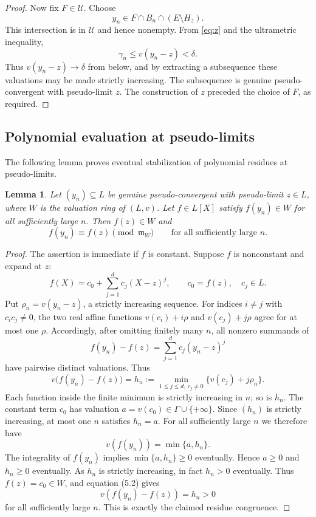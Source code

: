 \documentclass[11pt]{amsart}
\newtheorem{lemma}[theorem]{Lemma}
\theoremstyle{definition}
\theoremstyle{remark}
\newcommand{\m}{\mathfrak m}
\newcommand{\U}{\mathcal U}
\newcommand{\g}{\Gamma}
\begin{document}
\begin{proof}
Now fix $F\in\U$. Choose
\[
 y_n\in F\cap B_n\cap(E\setminus H_z).
\]
This intersection is in $\U$ and hence nonempty. From \eqref{eq:z} and the ultrametric inequality,
\[
 \gamma_n\leq v(y_n-z)<\delta.
\]
Thus $v(y_n-z)\to\delta$ from below, and by extracting a subsequence these valuations may be made strictly increasing. The subsequence is genuine pseudo-convergent with pseudo-limit $z$. The construction of $z$ preceded the choice of $F$, as required.
\end{proof}

\subsection{Polynomial evaluation at pseudo-limits}\label{sec:residue}


The following lemma proves eventual stabilization of polynomial residues at pseudo-limits.
\begin{lemma}\label{lem:residue}
Let $(y_n)\subseteq L$ be genuine pseudo-convergent with pseudo-limit $z\in L$, where $W$ is the valuation ring of $(L,v)$. Let $f\in L[X]$ satisfy $f(y_n)\in W$ for all sufficiently large $n$. Then $f(z)\in W$ and
\[
 f(y_n)\equiv f(z)\pmod{\m_W}\qquad\text{for all sufficiently large }n.
 \tag{5.1}\label{eq:residuestab}
\]
\end{lemma}
\begin{proof}
The assertion is immediate if $f$ is constant. Suppose $f$ is nonconstant and expand at $z$:
\[
 f(X)=c_0+\sum_{j=1}^d c_j(X-z)^j,
 \qquad c_0=f(z),\quad c_j\in L.
\]
Put $\rho_n=v(y_n-z)$, a strictly increasing sequence. For indices $i\ne j$ with $c_ic_j\ne0$, the two real affine functions $v(c_i)+i\rho$ and $v(c_j)+j\rho$ agree for at most one $\rho$. Accordingly, after omitting finitely many $n$, all nonzero summands of
\[
 f(y_n)-f(z)=\sum_{j=1}^d c_j(y_n-z)^j
\]
have pairwise distinct valuations. Thus
\[
 v\bigl(f(y_n)-f(z)\bigr)=h_n:=\min_{1\leq j\leq d,\ c_j\ne0}
 \{v(c_j)+j\rho_n\}.
 \tag{5.2}
\]
Each function inside the finite minimum is strictly increasing in $n$; so is $h_n$. The constant term $c_0$ has valuation $a=v(c_0)\in\g\cup\{+\infty\}$. Since $(h_n)$ is strictly increasing, at most one $n$ satisfies $h_n=a$. For all sufficiently large $n$ we therefore have
\[
 v(f(y_n))=\min\{a,h_n\}.
 \tag{5.3}
\]
The integrality of $f(y_n)$ implies $\min\{a,h_n\}\geq0$ eventually. Hence $a\geq0$ and $h_n\geq0$ eventually. As $h_n$ is strictly increasing, in fact $h_n>0$ eventually. Thus $f(z)=c_0\in W$, and equation (5.2) gives
\[
 v(f(y_n)-f(z))=h_n>0
\]
for all sufficiently large $n$. This is exactly the claimed residue congruence.
\end{proof}
\end{document}

